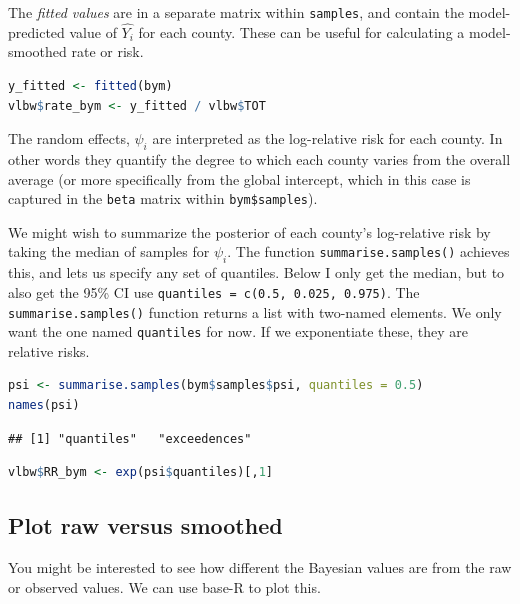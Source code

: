\documentclass[
]{book}
\newcommand{\passthrough}[1]{#1}
\begin{document}
The \emph{fitted values} are in a separate matrix within \passthrough{\lstinline!samples!}, and contain the model-predicted value of \(\hat{Y_i}\) for each county. These can be useful for calculating a model-smoothed rate or risk.

\begin{lstlisting}[language=R]
y_fitted <- fitted(bym)
vlbw$rate_bym <- y_fitted / vlbw$TOT
\end{lstlisting}

The random effects, \(\psi_i\) are interpreted as the log-relative risk for each county. In other words they quantify the degree to which each county varies from the overall average (or more specifically from the global intercept, which in this case is captured in the \passthrough{\lstinline!beta!} matrix within \passthrough{\lstinline!bym$samples!}).

We might wish to summarize the posterior of each county's log-relative risk by taking the median of samples for \(\psi_i\). The function \passthrough{\lstinline!summarise.samples()!} achieves this, and lets us specify any set of quantiles. Below I only get the median, but to also get the 95\% CI use \passthrough{\lstinline!quantiles = c(0.5, 0.025, 0.975)!}. The \passthrough{\lstinline!summarise.samples()!} function returns a list with two-named elements. We only want the one named \passthrough{\lstinline!quantiles!} for now. If we exponentiate these, they are relative risks.

\begin{lstlisting}[language=R]
psi <- summarise.samples(bym$samples$psi, quantiles = 0.5)
names(psi)  
\end{lstlisting}

\begin{lstlisting}
## [1] "quantiles"   "exceedences"
\end{lstlisting}

\begin{lstlisting}[language=R]
vlbw$RR_bym <- exp(psi$quantiles)[,1]
\end{lstlisting}

\hypertarget{plot-raw-versus-smoothed}{%
\subsection{Plot raw versus smoothed}\label{plot-raw-versus-smoothed}}

You might be interested to see how different the Bayesian values are from the raw or observed values. We can use base-R to plot this.
\end{document}
